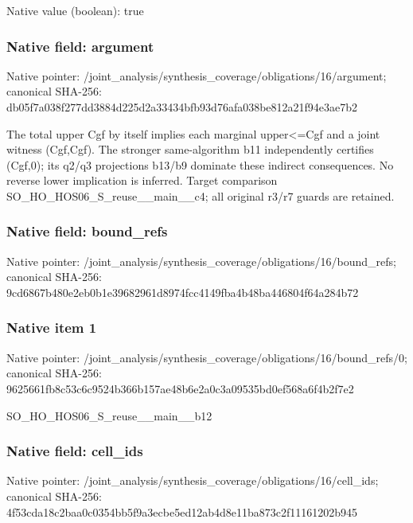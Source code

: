 \documentclass[10pt,a4paper]{article}
\begin{document}
Native value (boolean): true

\subsubsection{Native field: argument}
Native pointer: /joint\_\allowbreak{}analysis/synthesis\_\allowbreak{}coverage/obligations/16/argument; canonical SHA-256: db05f7a038f277dd3884d225d2a33434bfb93d76afa038be812a21f94e3ae7b2

\begingroup\raggedright\sloppy The total upper Cgf by itself implies each marginal upper<=\allowbreak{}Cgf and a joint witness (Cgf,\allowbreak{}Cgf). The stronger same-algorithm b11 independently certifies (Cgf,\allowbreak{}0);\allowbreak{} its q2/\allowbreak{}q3 projections b13/\allowbreak{}b9 dominate these indirect consequences. No reverse lower implication is inferred. Target comparison SO\_\allowbreak{}HO\_\allowbreak{}HOS06\_\allowbreak{}S\_\allowbreak{}reuse\_\allowbreak{}\_\allowbreak{}main\_\allowbreak{}\_\allowbreak{}c4;\allowbreak{} all original r3/\allowbreak{}r7 guards are retained.\par\endgroup

\subsubsection{Native field: bound\_\allowbreak{}refs}
Native pointer: /joint\_\allowbreak{}analysis/synthesis\_\allowbreak{}coverage/obligations/16/bound\_\allowbreak{}refs; canonical SHA-256: 9cd6867b480e2eb0b1e39682961d8974fcc4149fba4b48ba446804f64a284b72

\subsubsection{Native item 1}
Native pointer: /joint\_\allowbreak{}analysis/synthesis\_\allowbreak{}coverage/obligations/16/bound\_\allowbreak{}refs/0; canonical SHA-256: 9625661fb8c53c6c9524b366b157ae48b6e2a0c3a09535bd0ef568a6f4b2f7e2

\begingroup\raggedright\sloppy SO\_\allowbreak{}HO\_\allowbreak{}HOS06\_\allowbreak{}S\_\allowbreak{}reuse\_\allowbreak{}\_\allowbreak{}main\_\allowbreak{}\_\allowbreak{}b12\par\endgroup

\subsubsection{Native field: cell\_\allowbreak{}ids}
Native pointer: /joint\_\allowbreak{}analysis/synthesis\_\allowbreak{}coverage/obligations/16/cell\_\allowbreak{}ids; canonical SHA-256: 4f53cda18c2baa0c0354bb5f9a3ecbe5ed12ab4d8e11ba873c2f11161202b945
\end{document}
